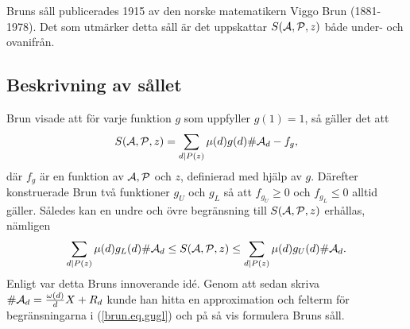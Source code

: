 
Bruns såll publicerades 1915 av den norske matematikern Viggo Brun (1881-1978).
Det som utmärker detta såll är det uppskattar $\S{A}{P}{z}$ både under- och ovanifrån.


\subsection{Beskrivning av sållet}
Brun visade att för varje funktion $g$ som uppfyller $g(1)=1$,
så gäller det att
\begin{equation*}
    \S{A}{P}{z} 
    = \sum_{d \mid P(z)} \mu(d) g(d) \card\A_d 
    - f_g,
\end{equation*} %
där $f_g$ är en funktion av $\A,\P$ och $z$, definierad med hjälp av $g$. 
Därefter konstruerade Brun två funktioner $g_U$ och $g_L$ så att $f_{g_U}\geq 0$ och $f_{g_L}\leq 0$ alltid gäller. 
Således kan en undre och övre begränsning till $\S{A}{P}{z}$ erhållas, nämligen
\begin{equation}\label{brun.eq.gugl}
    \sum_{d \mid P(z)} \mu(d) g_L(d) \card\A_d 
    \leq \S{A}{P}{z} 
    \leq \sum_{d \mid P(z)} \mu(d) g_U(d) \card\A_d.
\end{equation}
Enligt \cite{cojocarumurty} var detta Bruns innoverande idé.
Genom att sedan skriva $\card\A_d=\frac{\omega(d)}{d}X + R_d$ kunde han hitta en approximation och felterm för begränsningarna i (\ref{brun.eq.gugl}) och på så vis formulera Bruns såll.


